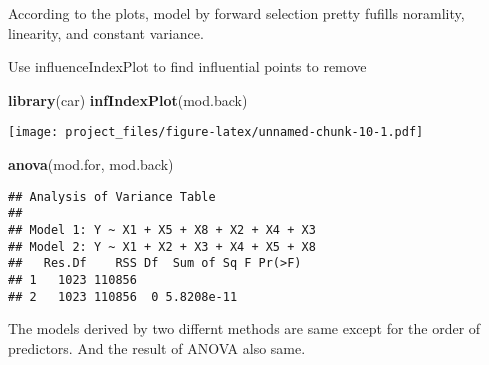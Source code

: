 \documentclass[]{article}
\newenvironment{Shaded}{\begin{snugshade}}{\end{snugshade}}
\newcommand{\KeywordTok}[1]{\textcolor[rgb]{0.13,0.29,0.53}{\textbf{#1}}}
\newcommand{\NormalTok}[1]{#1}
\begin{document}
According to the plots, model by forward selection pretty fufills
noramlity, linearity, and constant variance.

Use influenceIndexPlot to find influential points to remove

\begin{Shaded}
\begin{Highlighting}[]
\KeywordTok{library}\NormalTok{(car)}
\KeywordTok{infIndexPlot}\NormalTok{(mod.back)}
\end{Highlighting}
\end{Shaded}

\texttt{[image: project\_files/figure-latex/unnamed-chunk-10-1.pdf]}

\begin{Shaded}
\begin{Highlighting}[]
\KeywordTok{anova}\NormalTok{(mod.for, mod.back)}
\end{Highlighting}
\end{Shaded}

\begin{verbatim}
## Analysis of Variance Table
## 
## Model 1: Y ~ X1 + X5 + X8 + X2 + X4 + X3
## Model 2: Y ~ X1 + X2 + X3 + X4 + X5 + X8
##   Res.Df    RSS Df  Sum of Sq F Pr(>F)
## 1   1023 110856                       
## 2   1023 110856  0 5.8208e-11
\end{verbatim}

The models derived by two differnt methods are same except for the order
of predictors. And the result of ANOVA also same.
\end{document}
